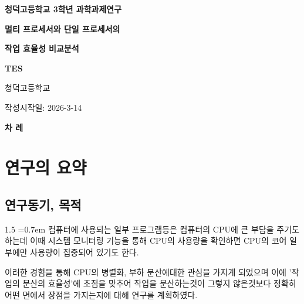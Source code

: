 \documentclass[a4paper, 12pt]{article}
\begin{document}
\begin{titlepage}
    \centering
    \vspace*{3cm}
    {\large \textbf{청덕고등학교 3학년 과학과제연구}} \par
    \vspace*{2.5cm}
    
    {\Huge \textbf{멀티 프로세서와 단일 프로세서의} \par}
    {\Huge \textbf{작업 효율성 비교분석} \par}
    \vspace{10.0cm}
    {\Large \textbf{TES}\par}
    \vspace{2cm}
    {\large 청덕고등학교 \par}
    
    \vfill %
    
    {\large 작성시작일: 2026-3-14 \par}
    \vspace{2cm}
\end{titlepage}
\newpage
\renewcommand{\contentsname}{}

\begin{center}
    \Large\bfseries 차\kern 30pt 례
\end{center}
\tableofcontents

\newpage %
\section{연구의 요약}
\subsection{연구동기, 목적}
\begin{spacing}{1.5}
\font=0.7em
컴퓨터에 사용되는 일부 프로그램등은 컴퓨터의 CPU에 큰 부담을 주기도 하는데 이때 시스템 모니터링 기능을 통해 CPU의 사용량을 확인하면 CPU의 코어 일부에만 사용량이 집중되어 있기도 한다. \par
이러한 경험을 통해 CPU의 병렬화, 부하 분산에대한 관심을 가지게 되었으며 이에 '작업의 분산의 효율성'에 초점을 맞추어 작업을 분산하는것이 그렇지 않은것보다 정확히 어떤 면에서 장점을 가지는지에 대해 연구를 계획하였다.
\end{spacing}
\end{document}
